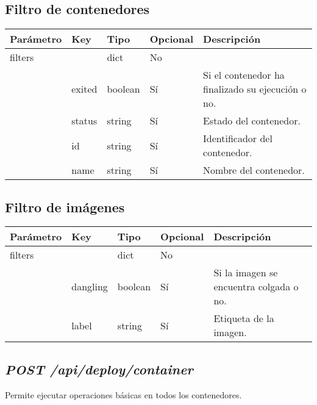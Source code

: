	\subsection{Filtro de contenedores}
		\begin{table}[h!]
			\centering
	\begin{adjustbox}{max width=\textwidth}
			\begin{tabular}{|l|l|l|l|l|}
				\hline
				Parámetro & Key & Tipo & Opcional & Descripción \\ \hline
				filters &  & dict & No &  \\ \hline
				& exited & boolean & Sí & Si el contenedor ha finalizado su ejecución o no. \\ \hline
				& status & string & Sí & Estado del contenedor. \\ \hline
				& id & string & Sí & Identificador del contenedor. \\ \hline
				& name & string & Sí & Nombre del contenedor. \\ \hline
			\end{tabular}
\end{adjustbox}
		\end{table}
	
	\subsection{Filtro de imágenes}
		\begin{table}[h!]
			\centering
	\begin{adjustbox}{max width=\textwidth}
			\begin{tabular}{|l|l|l|l|l|}
				\hline
				Parámetro & Key & Tipo & Opcional & Descripción \\ \hline
				filters &  & dict & No &  \\ \hline
				& dangling & boolean & Sí & Si la imagen se encuentra colgada o no. \\ \hline
				& label & string & Sí & Etiqueta de la imagen. \\ \hline
			\end{tabular}
\end{adjustbox}
		\end{table}
	
	
	\subsection{\textit{POST /api/deploy/container}}
		Permite ejecutar operaciones básicas en todos los contenedores.
		
